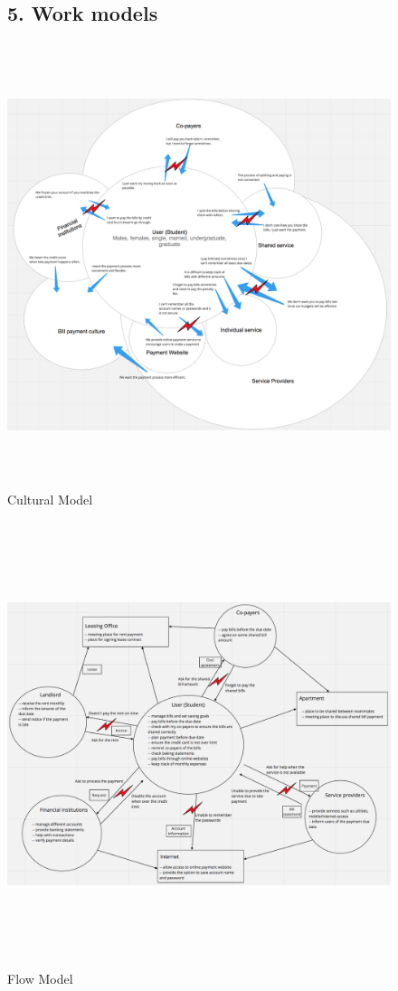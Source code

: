 \documentclass{sigchi}
\begin{document}
\begin{figure}[t!]
\subsection{5. Work models}
\centering
  \includegraphics[width=\textwidth,height=13cm]{Cultural_Model.png}
  \caption{Cultural Model}
  \label{fig:WMfigure10}
\end{figure}


\begin{figure}[h]
\centering
  \includegraphics[width=\textwidth,height=13cm]{Flow_Model.png}
  \caption{Flow Model}
  \label{fig:WMfigure11}
\end{figure}
\end{document}
